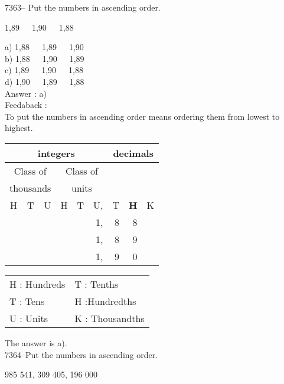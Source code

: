 \documentclass[letterpaper, 12pt]{article}
\begin{document}
7363-- Put the numbers in ascending order.\\ 
\begin{center}
1,89\ \ \ 1,90\ \ \ 1,88\\
\end{center}

a) 1,88\ \ \ 1,89\ \ \ 1,90\\
b) 1,88\ \ \ 1,90\ \ \ 1,89\\
c) 1,89\ \ \ 1,90\ \ \ 1,88\\
d) 1,90\ \ \ 1,89\ \ \ 1,88\\

Answer : a)\\

Feedaback :\\
To put the numbers in ascending order means ordering them from lowest to highest.\\
\begin{center}
\begin{tabular}{|rrr|rrr|rrr|}
\hline
\multicolumn{6}{|c|}{integers} &\multicolumn{3}{|c|}{decimals} \\
\hline
\multicolumn{3}{|c|}{Class of} &\multicolumn{3}{|c|}{Class of} &  \multicolumn{3}{c|}{} \\
\multicolumn{3}{|c|}{thousands} &\multicolumn{3}{|c|}{units} &  \multicolumn{3}{c|}{} \\
\hline
H & T & U &H & T & U, & T\up{th} & \textbf{H\up{th}} & K\up{th} \\
\hline
\hline
& & & &  & 1, & 8 & 8 &\\
& & & &  & 1, & 8 & 9 &\\
& & & &  & 1, & 9 & 0 &\\
\hline
\end{tabular}
\end{center}

\scriptsize
\begin{center}
\begin{tabular}{ll}
H : Hundreds & T\up{th} : Tenths\\
T : Tens & H\up{th} :Hundredths\\
U : Units & K\up{e} : Thousandths\\
\end{tabular}
\end{center}

\normalsize
The answer is a).\\


7364--Put the numbers in ascending order.\\ 
\begin{center}
985 541, 309 405, 196 000\\
\end{center}
\end{document}
